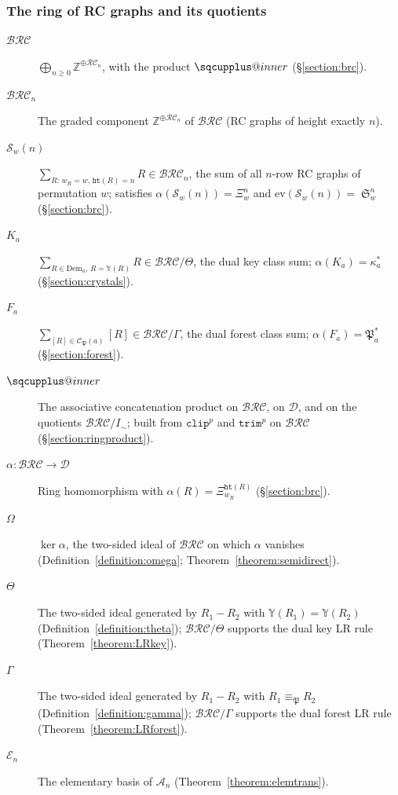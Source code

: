 \documentclass{amsart}
\makeatletter
\newcommand{\sqcupplus@inner}[2]{%
  \vcenter{\hbox{\ooalign{%
    \hfil$\m@th#1\sqcup$\hfil\cr
    \hfil\raisebox{0.15ex}{$\m@th#1\scriptscriptstyle+$}\hfil\cr
  }}}%
}
\newcommand{\sqcupplus}{\mathbin{\mathpalette\sqcupplus@inner\relax}}
\theoremstyle{definition}
\theoremstyle{remark}
\numberwithin{equation}{subsection}
\DeclareMathOperator{\sch}{\mathfrak{S}}
\newcommand{\wof}[1]{w_{#1}}
\newcommand{\trm}{\mathtt{trim}}
\newcommand{\hr}{\mathtt{ht}}
\newcommand{\clp}{\mathtt{clip}}
\newcommand{\BRC}{\mathcal{BRC}}
\newcommand{\RC}{\mathcal{RC}}
\newcommand{\dsch}{\ensuremath{\Xi}}
\newcommand{\coma}{\mathcal{A}}
\newcommand{\dcoma}{\mathcal{D}}
\newcommand{\forest}{\mathfrak{P}}
\makeatother
\begin{document}
\subsubsection*{The ring of RC graphs and its quotients}
\begin{description}
\item[$\BRC$] $\bigoplus_{n\geq 0}\mathbb{Z}^{\oplus\RC_n}$, with the product $\sqcupplus$ (\S\ref{section:brc}).
\item[$\BRC_n$] The graded component $\mathbb{Z}^{\oplus \RC_n}$ of $\BRC$ (RC graphs of height exactly $n$).
\item[$\mathcal{S}_w(n)$] $\sum_{R:\,\wof{R}=w,\,\hr(R)=n}R\in\BRC_n$, the sum of all $n$-row RC graphs of permutation $w$; satisfies $\alpha(\mathcal{S}_w(n))=\dsch_w^n$ and $\mathrm{ev}(\mathcal{S}_w(n))=\sch_w^n$ (\S\ref{section:brc}).
\item[$K_a$] $\sum_{R\in\mathrm{Dem}_a,\,R=\mathbb{Y}(R)} R\in\BRC/\Theta$, the dual key class sum; $\alpha(K_a)=\kappa_a^*$ (\S\ref{section:crystals}).
\item[$F_a$] $\sum_{[R]\in\mathcal{C}_\forest(a)}[R]\in\BRC/\Gamma$, the dual forest class sum; $\alpha(F_a)=\forest_a^*$ (\S\ref{section:forest}).
\item[$\sqcupplus$] The associative concatenation product on $\BRC$, on $\dcoma$, and on the quotients $\BRC/I_\sim$; built from $\clp^p$ and $\trm^p$ on $\BRC$ (\S\ref{section:ringproduct}).
\item[$\alpha:\BRC\to\dcoma$] Ring homomorphism with $\alpha(R)=\dsch_{\wof{R}}^{\hr(R)}$ (\S\ref{section:brc}).
\item[$\Omega$] $\ker\alpha$, the two-sided ideal of $\BRC$ on which $\alpha$ vanishes (Definition~\ref{definition:omega}; Theorem~\ref{theorem:semidirect}).
\item[$\Theta$] The two-sided ideal generated by $R_1-R_2$ with $\mathbb{Y}(R_1)=\mathbb{Y}(R_2)$ (Definition~\ref{definition:theta}); $\BRC/\Theta$ supports the dual key LR rule (Theorem~\ref{theorem:LRkey}).
\item[$\Gamma$] The two-sided ideal generated by $R_1-R_2$ with $R_1\equiv_\forest R_2$ (Definition~\ref{definition:gamma}); $\BRC/\Gamma$ supports the dual forest LR rule (Theorem~\ref{theorem:LRforest}).
\item[$\mathcal{E}_n$] The elementary basis of $\coma_n$ (Theorem~\ref{theorem:elemtrans}).
\end{description}
\end{document}
